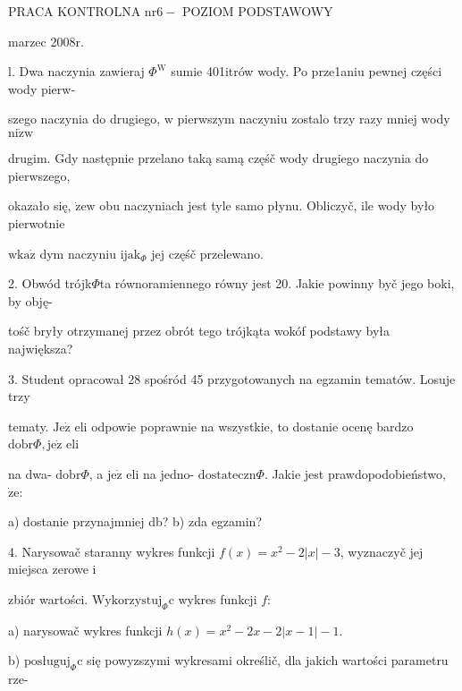\documentclass[a4paper,12pt]{article}
\begin{document}
PRACA KONTROLNA $\mathrm{n}\mathrm{r}6-$ POZIOM PODSTAWOWY

marzec 2008r.

l. Dwa naczynia zawieraj $\Phi^{\mathrm{W}}$ sumie 401itrów wody. Po prze1aniu pewnej części wody pierw-

szego naczynia do drugiego, $\mathrm{w}$ pierwszym naczyniu zostalo trzy razy mniej wody $\mathrm{n}\mathrm{i}\dot{\mathrm{z}}\mathrm{w}$

drugim. Gdy następnie przelano taką samą częśč wody drugiego naczynia do pierwszego,

okazało się, $\dot{\mathrm{z}}\mathrm{e}\mathrm{w}$ obu naczyniach jest tyle samo płynu. Obliczyč, ile wody było pierwotnie

$\mathrm{w}\mathrm{k}\mathrm{a}\dot{\mathrm{z}}$ dym naczyniu $\mathrm{i}\mathrm{j}\mathrm{a}\mathrm{k}_{\Phi}$ jej częśč przelewano.

2. Obwód trójk$\Phi$ta równoramiennego równy jest 20. Jakie powinny byč jego boki, by obję-

tośč bryły otrzymanej przez obrót tego trójkąta wokóf podstawy była największa?

3. Student opracował 28 spośród 45 przygotowanych na egzamin tematów. Losuje trzy

tematy. $\mathrm{J}\mathrm{e}\dot{\mathrm{z}}$ eli odpowie poprawnie na wszystkie, to dostanie ocenę bardzo $\mathrm{d}\mathrm{o}\mathrm{b}\mathrm{r}\Phi, \mathrm{j}\mathrm{e}\dot{\mathrm{z}}$ eli

na dwa- $\mathrm{d}\mathrm{o}\mathrm{b}\mathrm{r}\Phi$, a $\mathrm{j}\mathrm{e}\dot{\mathrm{z}}$ eli na jedno- $\mathrm{d}\mathrm{o}\mathrm{s}\mathrm{t}\mathrm{a}\mathrm{t}\mathrm{e}\mathrm{c}\mathrm{z}\mathrm{n}\Phi$. Jakie jest prawdopodobieństwo, $\dot{\mathrm{z}}\mathrm{e}$:

a) dostanie przynajmniej db? b) zda egzamin?

4. Narysowač staranny wykres funkcji $f(x)=x^{2}-2|x|-3$, wyznaczyč jej miejsca zerowe $\mathrm{i}$

zbiór wartości. $\mathrm{W}\mathrm{y}\mathrm{k}\mathrm{o}\mathrm{r}\mathrm{z}\mathrm{y}\mathrm{s}\mathrm{t}\mathrm{u}\mathrm{j}_{\Phi}\mathrm{c}$ wykres funkcji $f$:

a) narysowač wykres funkcji $h(x)=x^{2}-2x-2|x-1|-1.$

b) $\mathrm{p}\mathrm{o}\mathrm{s}\text{ł} \mathrm{u}\mathrm{g}\mathrm{u}\mathrm{j}_{\Phi}\mathrm{c}$ się powyzszymi wykresami określič, dla jakich wartości parametru rze-
\end{document}
